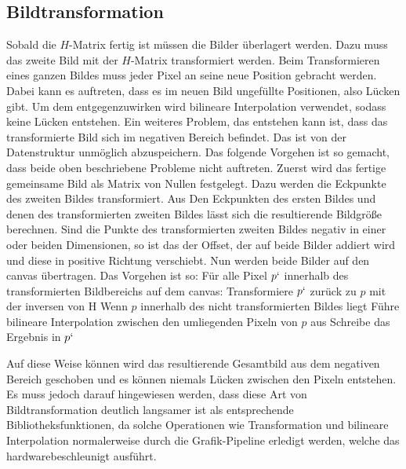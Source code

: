 \subsection{Bildtransformation}
Sobald die $H$-Matrix fertig ist müssen die Bilder überlagert werden. Dazu muss das zweite Bild mit der $H$-Matrix transformiert werden. Beim Transformieren eines ganzen Bildes muss jeder Pixel an seine neue Position gebracht werden. Dabei kann es auftreten, dass es im neuen Bild ungefüllte Positionen, also Lücken gibt. Um dem entgegenzuwirken wird bilineare Interpolation verwendet, sodass keine Lücken entstehen. Ein weiteres Problem, das entstehen kann ist, dass das transformierte Bild sich im negativen Bereich befindet. Das ist von der Datenstruktur unmöglich abzuspeichern. Das folgende Vorgehen ist so gemacht, dass beide oben beschriebene Probleme nicht auftreten.
Zuerst wird das fertige gemeinsame Bild als Matrix von Nullen festgelegt. Dazu werden die Eckpunkte des zweiten Bildes transformiert. Aus Den Eckpunkten des ersten Bildes und denen des transformierten zweiten Bildes lässt sich die resultierende Bildgröße berechnen. Sind die Punkte des transformierten zweiten Bildes negativ in einer oder beiden Dimensionen, so ist das der Offset, der auf beide Bilder addiert wird und diese in positive Richtung verschiebt.
Nun werden beide Bilder auf den canvas übertragen. Das Vorgehen ist so:
Für alle Pixel $p`$ innerhalb des transformierten Bildbereichs auf dem canvas:
Transformiere $p`$ zurück zu $p$ mit der inversen von H
Wenn $p$ innerhalb des nicht transformierten Bildes liegt
	Führe bilineare Interpolation zwischen den umliegenden Pixeln von $p$ aus
	Schreibe das Ergebnis in $p`$

Auf diese Weise können wird das resultierende Gesamtbild aus dem negativen Bereich geschoben und es können niemals Lücken zwischen den Pixeln entstehen. Es muss jedoch darauf hingewiesen werden, dass diese Art von Bildtransformation deutlich langsamer ist als entsprechende Bibliotheksfunktionen, da solche Operationen wie Transformation und bilineare Interpolation normalerweise durch die Grafik-Pipeline erledigt werden, welche das hardwarebeschleunigt ausführt.

\clearpage

